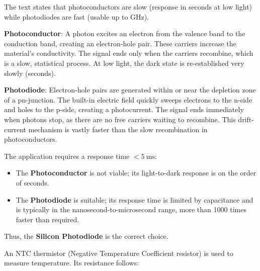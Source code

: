 The text states that photoconductors are slow (response in seconds at low light) while photodiodes are fast (usable up to GHz).  



\begin{solutionblock}
\textbf{Photoconductor}: A photon excites an electron from the valence band to the conduction band, creating an electron-hole pair. 
These carriers increase the material's conductivity. 
The signal ends only when the carriers recombine, which is a slow, statistical process. 
At low light, the dark state is re-established very slowly (seconds).  

\textbf{Photodiode}: Electron-hole pairs are generated within or near the depletion zone of a pn-junction. 
The built-in electric field quickly sweeps electrons to the n-side and holes to the p-side, creating a photocurrent. 
The signal ends immediately when photons stop, as there are no free carriers waiting to recombine. 
This drift-current mechanism is vastly faster than the slow recombination in photoconductors.
\end{solutionblock}




\begin{solutionblock}
The application requires a response time $< 5~\text{ms}$:

\begin{itemize}
    \item The \textbf{Photoconductor} is not viable; its light-to-dark response is on the order of seconds.
    \item The \textbf{Photodiode} is suitable; its response time is limited by capacitance and is typically in the nanosecond-to-microsecond range, more than 1000 times faster than required.
\end{itemize}

Thus, the \textbf{Silicon Photodiode} is the correct choice.
\end{solutionblock}




An NTC thermistor (Negative Temperature Coefficient resistor) is used to measure temperature. Its resistance follows:

